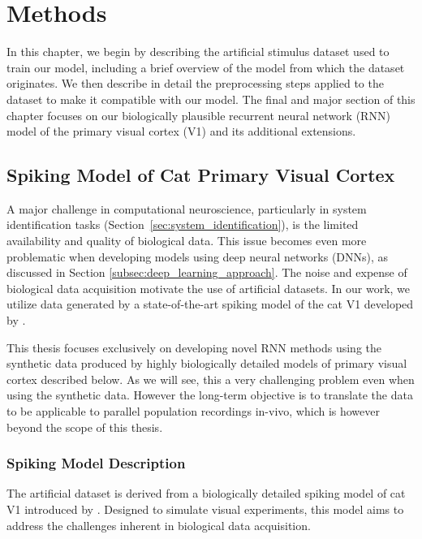 \chapter{Methods}
\label{chap:methods}

In this chapter, we begin by describing the artificial stimulus dataset used to train our model, including a brief overview of the model from which the dataset originates. We then describe in detail the preprocessing steps applied to the dataset to make it compatible with our model. The final and major section of this chapter focuses on our biologically plausible recurrent neural network (RNN) model of the primary visual cortex (V1) and its additional extensions.

\section{Spiking Model of Cat Primary Visual Cortex}
\label{sec:cats_model}
A major challenge in computational neuroscience, particularly in system identification tasks (Section~\ref{sec:system_identification}), is the limited availability and quality of biological data. This issue becomes even more problematic when developing models using deep neural networks (DNNs), as discussed in Section \ref{subsec:deep_learning_approach}. The noise and expense of biological data acquisition motivate the use of artificial datasets. In our work, we utilize data generated by a state-of-the-art spiking model of the cat V1 developed by \citet{antolik2024comprehensive}.

This thesis focuses exclusively on developing novel RNN methods using the synthetic data produced by highly biologically detailed models of primary visual cortex described below. As we will see, this a very challenging problem even when using the synthetic data. However the long-term objective is to translate the data to be applicable to parallel population recordings in-vivo, which is however beyond the scope of this thesis.

\subsection{Spiking Model Description}
\label{subsec:spiking_model_description}

The artificial dataset is derived from a biologically detailed spiking model of cat V1 introduced by \citet{antolik2024comprehensive}. Designed to simulate visual experiments, this model aims to address the challenges inherent in biological data acquisition.

